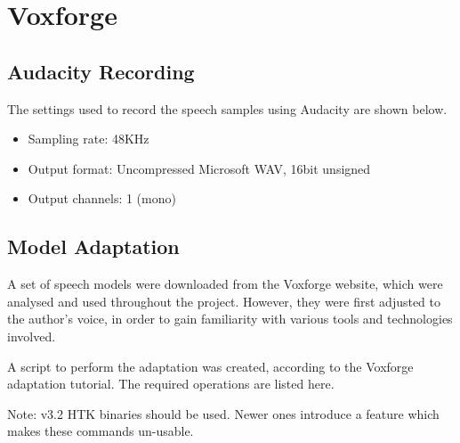 \chapter{Voxforge} %
\label{apdx:voxforge}


\section{Audacity Recording} %
\label{apdx:audacity_recording}
	The settings used to record the speech samples using Audacity are shown below.
	\begin{itemize}
		\item Sampling rate: 48KHz
		\item Output format: Uncompressed Microsoft WAV, 16bit unsigned
		\item Output channels: 1 (mono)
	\end{itemize}


\section{Model Adaptation} %
\label{apdx:model_adaptation}
	A set of speech models were downloaded from the Voxforge website, which were analysed and used throughout the project.  However, they were first adjusted to the author's voice, in order to gain familiarity with various tools and technologies involved.

	A script to perform the adaptation was created, according to the Voxforge adaptation tutorial.  The required operations are listed here.

	Note: v3.2 HTK binaries should be used.  Newer ones introduce a feature which makes these commands un-usable.


